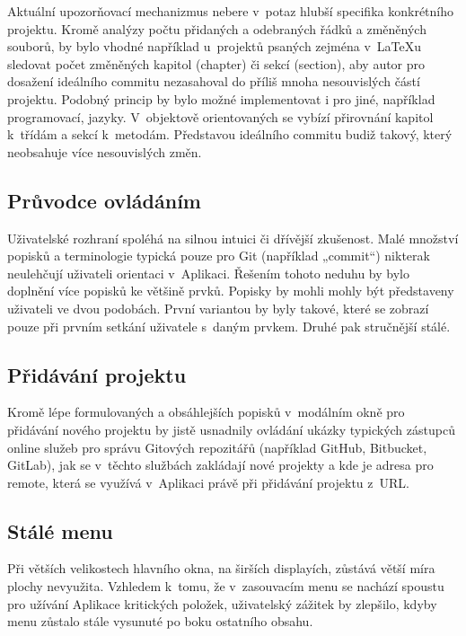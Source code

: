 Aktuální upozorňovací mechanizmus nebere v~potaz hlubší specifika konkrétního projektu. Kromě analýzy počtu přidaných a odebraných řádků a změněných souborů, by bylo vhodné například u~projektů psaných zejména v~\LaTeX{u} sledovat počet změněných kapitol (chapter) či sekcí (section), aby autor pro dosažení ideálního commitu nezasahoval do příliš mnoha nesouvislých částí projektu. Podobný princip by bylo možné implementovat i pro jiné, například programovací, jazyky. V~objektově orientovaných se vybízí přirovnání kapitol k~třídám a sekcí k~metodám. Představou ideálního commitu budiž takový, který neobsahuje více nesouvislých změn.

\subsection{Průvodce ovládáním}

Uživatelské rozhraní spoléhá na silnou intuici či dřívější zkušenost. Malé množství popisků a terminologie typická pouze pro Git (například „commit“) nikte\-rak neulehčují uživateli orientaci v~Aplikaci. Řešením tohoto neduhu by bylo doplnění více popisků ke většině prvků. Popisky by mohli mohly být představeny uživateli ve dvou podobách. První variantou by byly takové, které se zobrazí pouze při prvním setkání uživatele s~daným prvkem. Druhé pak stručnější stálé.

\subsection{Přidávání projektu}

Kromě lépe formulovaných a obsáhlejších popisků v~modálním okně pro přidávání nového projektu by jistě usnadnily ovládání ukázky typických zástupců online služeb pro správu Gitových repozitářů (například GitHub, Bitbucket, GitLab), jak se v~těchto službách zakládají nové projekty a kde je adresa pro remote, která se využívá v~Aplikaci právě při přidávání projektu z~URL.

\subsection{Stálé menu}

Při větších velikostech hlavního okna, na širších displayích, zůstává větší míra plochy nevyužita. Vzhledem k~tomu, že v~zasouvacím menu se nachází spoustu pro užívání Aplikace kritických položek, uživatelský zážitek by zlepšilo, kdyby menu zůstalo stále vysunuté po boku ostatního obsahu.

